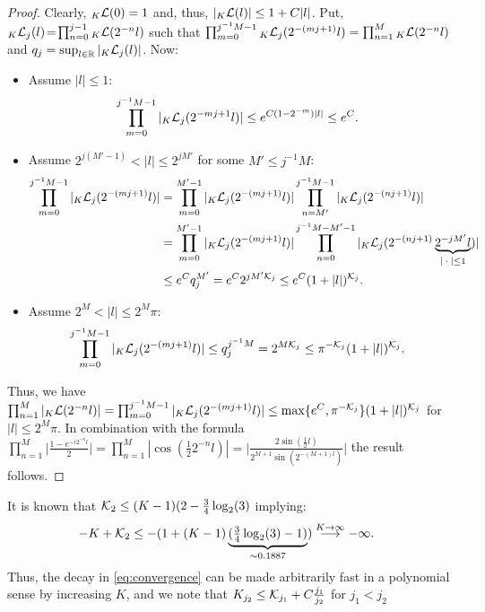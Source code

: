 \documentclass[a4paper, 11pt]{article}
\DeclareMathOperator{\1}{\mathds{1}}
\begin{document}
\begin{proof}
Clearly, $_{K}\mathcal{L}(0)=1$ and, thus, $|{}_{K}\mathcal{L}(l)|\leq 1+C|l|$. Put, ${}_{K}\mathcal{L}_{j}(l) \!=\! \prod_{n=0}^{j-1}{}_{K}\mathcal{L}(2^{-n}l)$ such that $\prod_{m=0}^{j^{-1}M-1}{}_{K}\mathcal{L}_{j}(2^{-(mj+1)}l) = \prod_{n=1}^{M}{}_{K}\mathcal{L}(2^{-n}l)$ and $q_{j} = \sup_{l\in\mathbb{R}}|{}_{K}\mathcal{L}_{j}(l)|$. Now:
\begin{itemize}
	\item[1.] Assume $|l|\leq1$:
	\begin{align*}
	\prod_{m=0}^{j^{-1}M-1}|{}_{K}\mathcal{L}_{j}(2^{-mj+1}l)| & \leq e^{C(1-2^{-m})|l|}\leq e^{C}.
	\end{align*}
	\item[2.] Assume $2^{j(M'-1)}<|l|\leq2^{jM'}$ for some $M'\leq j^{-1}M$:
	\begin{align*}
	\prod_{m=0}^{j^{-1}M-1}|{}_{K}\cL_{j}(2^{-(mj+1)}l)| & = \prod_{m=0}^{M'-1}|{}_{K}\cL_{j}(2^{-(mj+1)}l)|\prod_{n=M'}^{j^{-1}M-1}|{}_{K}\cL_{j}(2^{-(nj+1)}l)| \\
	& = \prod_{m=0}^{M'-1}|{}_{K}\cL_{j}(2^{-(mj+1)}l)|\prod_{n=0}^{j^{-1}M-M'-1}|{}_{K}\cL_{j}(2^{-(nj+1)}\underbrace{2^{-jM'}l}_{|\!\ \cdot\!\ |\leq1})| \\
	& \leq e^{C} q_{j}^{M'} = e^{C}2^{jM'\cK_{j}} \leq e^{C}(1+|l|)^{\cK_{j}}.
	\end{align*}
	\item[3.] Assume $2^{M}<|l|\leq2^{M}\pi$:
	\begin{align*}
	\prod_{m=0}^{j^{-1}M-1}|{}_{K}\mathcal{L}_{j}(2^{-(mj+1)}l)| & \leq q_{j}^{j^{-1}M} = 2^{M\mathcal{K}_{j}}\leq \pi^{-\mathcal{K}_{j}}(1+|l|)^{\mathcal{K}_{j}}.
	\end{align*}
\end{itemize}
Thus, we have $\prod_{n=1}^{M}|{}_{K}\mathcal{L}(2^{-n}l)| = \prod_{m=0}^{j^{-1}M-1}|{}_{K}\mathcal{L}_{j}(2^{-(mj+1)}l)| \leq \max\{e^{C},\pi^{-\mathcal{K}_{j}}\}(1+|l|)^{\mathcal{K}_{j}}$ for $|l|\leq 2^{M}\pi$. In combination with the formula $\prod_{n=1}^{M}\Big|\tfrac{1-e^{-i2^{-n}l}}{2}\Big| = \prod_{n=1}^{M}|\cos(\tfrac{1}{2}2^{-n}l)| = \Big|\tfrac{2\sin(\frac{1}{2}l)}{2^{M+1}\sin(2^{-(M+1)l})}\Big|$ the result follows.
\end{proof}
It is known that $\mathcal{K}_{2} \leq (K-1)(2-\tfrac{3}{4}\log_{2}(3)$ \cite{DaubechiesTenLecturesOn} implying:
\begin{align}
\label{eq:decay}
-K+\mathcal{K}_{2} & \leq -(1+(K-1)\underbrace{(\tfrac{3}{4}\log_{2}(3)-1)}_{\sim 0.1887}) \stackrel{K\rightarrow\infty}{\longrightarrow} -\infty.
\end{align}
Thus, the decay in \eqref{eq:convergence} can be made arbitrarily fast in a polynomial sense by increasing $K$, and we note that $K_{j_{2}}\leq\mathcal{K}_{j_{1}}+C\tfrac{j_{1}}{j_{2}}$ for $j_{1}<j_{2}$
\end{document}

